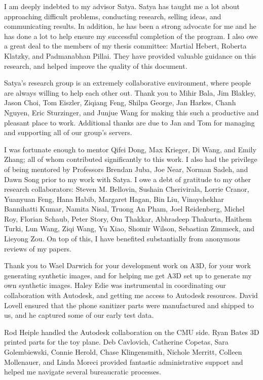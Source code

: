 \documentclass[12pt]{cmuthesis}
\begin{document}
\begin{acknowledgments}
  I am deeply indebted to my advisor Satya.
  Satya has taught me a lot about approaching difficult problems, conducting
  research, selling ideas, and communicating results.
  In addition, he has been a strong advocate for me and he has done a lot to
  help ensure my successful completion of the program.
  I also owe a great deal to the members of my thesis committee: Martial Hebert,
  Roberta Klatzky, and Padmanabhan Pillai.
  They have provided valuable guidance on this research, and helped improve the
  quality of this document.

  Satya's research group is an extremely collaborative environment, where
  people are always willing to help each other out.
  Thank you to Mihir Bala, Jim Blakley, Jason Choi, Tom Eiszler, Ziqiang Feng,
  Shilpa George, Jan Harkes, Chanh Nguyen, Eric Sturzinger, and Junjue Wang
  for making this such a productive and pleasant place to work.
  Additional thanks are due to Jan and Tom for managing and supporting all of
  our group's servers.

  I was fortunate enough to mentor Qifei Dong, Max Krieger, Di Wang, and Emily
  Zhang; all of whom contributed significantly to this work.
  I also had the privilege of being mentored by Professors Brendan Juba,
  Joe Near, Norman Sadeh, and Dawn Song prior to my work with Satya.
  I owe a debt of gratitude to my other research collaborators:
  Steven M. Bellovin, Sushain Cherivirala, Lorrie Cranor, Yuanyuan Feng, Hana
  Habib, Margaret Hagan, Bin Liu, Vinayshekhar Bannihatti Kumar, Namita Nisal,
  Truong An Pham, Joel Reidenberg, Michel Roy, Florian Schaub, Peter Story,
  Om Thakkar, Abhradeep Thakurta, Haithem Turki, Lun Wang, Ziqi Wang, Yu Xiao,
  Shomir Wilson, Sebastian Zimmeck, and Lieyong Zou.
  On top of this, I have benefited substantially from anonymous reviews of my
  papers.

  Thank you to Wael Darwich for your development work on A3D, for your work
  generating synthetic images, and for helping me get A3D set up to generate my
  own synthetic images.
  Haley Edie was instrumental in coordinating our collaboration with Autodesk,
  and getting me access to Autodesk resources.
  David Lovell ensured that the phone sanitizer parts were manufactured and
  shipped to us, and he captured some of our early test data.

  Rod Heiple handled the Autodesk collaboration on the CMU side.
  Ryan Bates 3D printed parts for the toy plane.
  Deb Cavlovich, Catherine Copetas, Sara Golembiewski, Connie Herold,
  Chase Klingensmith, Nichole Merritt, Colleen Mollenauer, and Linda Moreci
  provided fantastic administrative support and helped me navigate several
  bureaucratic processes.


\end{acknowledgments}
\end{document}
